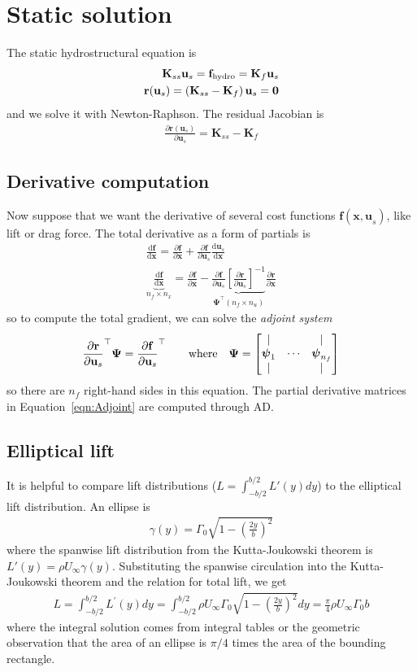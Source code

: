 \documentclass[10pt]{article}
\newcommand{\pp}[2]{\frac{\partial #1}{\partial #2}}
\newcommand{\dd}[2]{\frac{\textrm{d} #1}{\textrm{d} #2}}
\newcommand{\mbf}[1]{\mathbf{#1}}
\newcommand{\be}{\begin{eqnarray}}
\newcommand{\ee}{\end{eqnarray}}
\newcommand{\Uinf}{U_{\infty}}
\newcommand{\tn}[1]{\textnormal{#1}}
\begin{document}
\onecolumn
\clearpage
\section{Static solution}
The static hydrostructural equation is
\be
\mbf{K}_{ss} \mbf{u}_s   = \mbf{f}_{\tn{hydro}} = \mbf{K}_f \mbf{u}_s
\\
\mbf{r}(\mbf{u}_s) = \left(\mbf{K}_{ss} - \mbf{K}_f\right)\mbf{u}_s  = \mbf{0}
\ee
and we solve it with Newton-Raphson.
The residual Jacobian is
\be
\pp{\mbf{r}(\mbf{u}_s)}{\mbf{u}_s}
=
\mbf{K}_{ss} - \mbf{K}_{f}
\ee

\subsection{Derivative computation}
% 
Now suppose that we want the derivative of several cost functions $\mbf{f}(\mbf{x,u}_s)$, like lift or drag force.
The total derivative as a form of partials \cite[Sec. 6.7.2]{Martins2022} is
\be
\dd{\mbf{f}}{\mbf{x}} =
\pp{\mbf{f}}{\mbf{x}} + \pp{\mbf{f}}{\mbf{u}_s} \dd{\mbf{u}_s}{\mbf{x}}
\\
\label{eqn:Adjoint}
\boxed{
    \underbrace{
        \dd{ \mbf{f}}{\mbf{x}}
    }_{n_f \times n_x}
    = \pp{\mbf{f}}{\mbf{x}}
    -
    \underbrace{\pp{\mbf{f}}{\mbf{u}_s} \left[\pp{\mbf{r}}{\mbf{u}_s}\right]^{-1}
    }_{\boldsymbol{\Psi^\top} (n_f \times n_u)}
    \pp{\mbf{r}}{\mbf{x}}
}
\ee
so to compute the total gradient, we can solve the \emph{adjoint system}
\be
\pp{\mbf{r}}{\mbf{u}_s}^\top \boldsymbol{\Psi}
=
\pp{\mbf{f}}{\mbf{u}_s}^\top
\qquad
\tn{where}
\quad
\boldsymbol{\Psi} = \begin{bmatrix}
    |                   &        & |                       \\
    \boldsymbol{\psi}_1 & \cdots & \boldsymbol{\psi}_{n_f} \\
    |                   &        & |                       \\
\end{bmatrix}
\ee
so there are $n_f$ right-hand sides in this equation.
The partial derivative matrices in Equation~\eqref{eqn:Adjoint} are computed through \ac{AD}.
\subsection{Elliptical lift}
It is helpful to compare lift distributions ($L = \int_{-b/2}^{b/2}L'(y) dy$) to the elliptical lift distribution.
An ellipse is
\be
\gamma(y)=\Gamma_0 \sqrt{1-\left(\frac{2 y}{b}\right)^2}
\ee
where the spanwise lift distribution from the Kutta-Joukowski theorem is $L'(y) = \rho \Uinf \gamma(y)$.
Substituting the spanwise circulation into the Kutta-Joukowski theorem and the relation for total lift, we get
\be
L=\int_{-b / 2}^{b / 2} L^{\prime}(y) d y=\int_{-b / 2}^{b / 2} \rho \Uinf \Gamma_0 \sqrt{1-\left(\frac{2 y}{b}\right)^2} d y=\frac{\pi}{4} \rho \Uinf \Gamma_0 b
\ee
where the integral solution comes from integral tables or the geometric observation that the area of an ellipse is $\pi/4$ times the area of the bounding rectangle.
\end{document}

